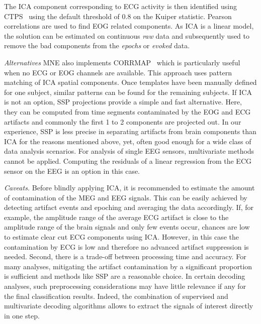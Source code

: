 The ICA component corresponding to ECG activity is then identified using \ac{CTPS}~\citep{dammers2008integration} using the default threshold of 0.8 on the Kuiper statistic. Pearson correlations are used to find EOG related components. As ICA is a linear model, the solution can be estimated on continuous \textit{raw} data and subsequently used to remove the bad components from the \textit{epochs} or \textit{evoked} data. 

\emph{Alternatives} MNE also implements CORRMAP~\citep{viola2009semi} which is particularly useful when no ECG or EOG channels are available. This approach uses pattern matching of ICA spatial components. Once templates have been manually defined for one subject, similar patterns can be found for the remaining subjects. If ICA is not an option, SSP projections provide a simple and fast alternative. Here, they can be computed from time segments contaminated by the EOG and ECG artifacts and commonly the first 1 to 2 components are projected out. In our experience, SSP is less precise in separating artifacts from brain components than ICA for the reasons mentioned above, yet, often good enough for a wide class of data analysis scenarios. For analysis of single EEG sensors, multivariate methods cannot be applied. Computing the residuals of a linear regression from the ECG sensor on the EEG is an option in this case.

\emph{Caveats.} Before blindly applying ICA, it is recommended to estimate the amount of contamination of the MEG and EEG signals. This can be easily achieved by detecting artifact events and epoching and averaging the data accordingly. If, for example, the amplitude range of the average ECG artifact is close to the amplitude range of the brain signals and only few events occur, chances are low to estimate clear cut ECG components using ICA. However, in this case the contamination by ECG is low and therefore no advanced artifact suppression is needed. Second, there is a trade-off between processing time and accuracy. For many analyses, mitigating the artifact contamination by a significant proportion is sufficient and methods like SSP are a reasonable choice. In certain decoding analyses, such preprocessing considerations may have little relevance if any for the final classification results. Indeed, the combination of supervised and multivariate decoding algorithms allows to extract the signals of interest directly in one step.

